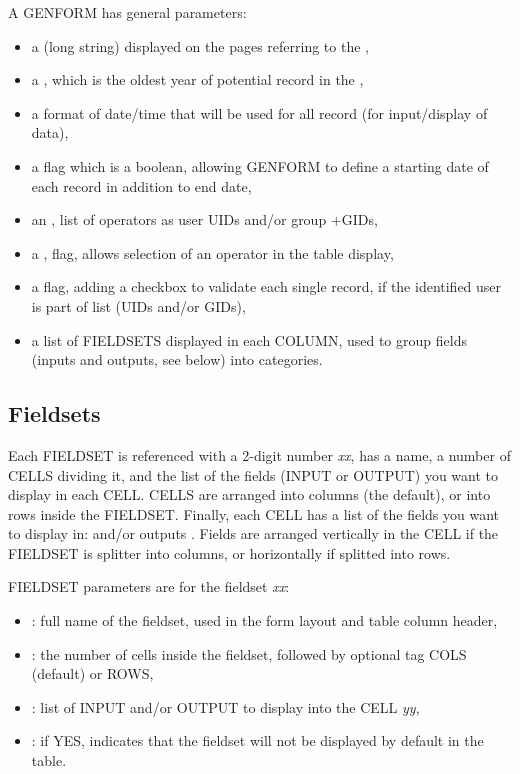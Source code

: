 A GENFORM  has general parameters:
\begin{itemize}
	\item a  (long string) displayed on the pages referring to the ,
	\item a , which is the oldest year of potential record in the ,
	\item a  format of date/time that will be used for all record (for input/display of data),
	\item a  flag which is a boolean, allowing GENFORM to define a starting date of each record in addition to end date,
	\item an , list of operators as user UIDs and/or group +GIDs,
	\item a , flag, allows selection of an operator in the table display,
	\item a  flag, adding a checkbox to validate each single record, if the identified user is part of  list (UIDs and/or GIDs),
	\item a list of FIELDSETS displayed in each COLUMN, used to group fields (inputs and outputs, see below) into categories.
\end{itemize}

\subsection{Fieldsets}

Each FIELDSET is referenced with a 2-digit number {\it xx}, has a name, a number of CELLS dividing it, and the list of the fields (INPUT or OUTPUT) you want to display in each CELL. CELLS are arranged into columns (the default), or into rows inside the FIELDSET. Finally, each CELL has a list of the fields you want to display in:  and/or outputs . Fields are arranged vertically in the CELL if the FIELDSET is splitter into columns, or horizontally if splitted into rows.

FIELDSET parameters are for the fieldset {\it xx}:
\begin{itemize}
	\item {}: full name of the fieldset, used in the form layout and table column header,
	\item {}: the number of cells inside the fieldset, followed by optional tag COLS (default) or ROWS,
	\item {}: list of INPUT and/or OUTPUT to display into the CELL {\it yy},
	\item {}: if YES, indicates that the fieldset will not be displayed by default in the table.
\end{itemize}


